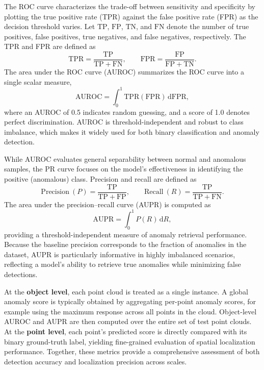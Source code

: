 The ROC curve characterizes the trade-off between sensitivity and specificity by plotting the true positive rate (TPR) against the false positive rate (FPR) as the decision threshold varies. Let $\mathrm{TP}$, $\mathrm{FP}$, $\mathrm{TN}$, and $\mathrm{FN}$ denote the number of true positives, false positives, true negatives, and false negatives, respectively. The TPR and FPR are defined as
\begin{equation}
\mathrm{TPR} = \frac{\mathrm{TP}}{\mathrm{TP} + \mathrm{FN}}, 
\qquad
\mathrm{FPR} = \frac{\mathrm{FP}}{\mathrm{FP} + \mathrm{TN}}.
\end{equation}
The area under the ROC curve (AUROC) summarizes the ROC curve into a single scalar measure,
\begin{equation}
\mathrm{AUROC} = \int_{0}^{1} \mathrm{TPR}(\mathrm{FPR})\,\mathrm{d}\mathrm{FPR},
\end{equation}
where an AUROC of 0.5 indicates random guessing, and a score of 1.0 denotes perfect discrimination. AUROC is threshold-independent and robust to class imbalance, which makes it widely used for both binary classification and anomaly detection.

While AUROC evaluates general separability between normal and anomalous samples, the PR curve focuses on the model’s effectiveness in identifying the positive (anomalous) class. Precision and recall are defined as
\begin{equation}
\mathrm{Precision}\ (P) = \frac{\mathrm{TP}}{\mathrm{TP} + \mathrm{FP}}, 
\qquad
\mathrm{Recall}\ (R) = \frac{\mathrm{TP}}{\mathrm{TP} + \mathrm{FN}}.
\end{equation}
The area under the precision–recall curve (AUPR) is computed as
\begin{equation}
\mathrm{AUPR} = \int_{0}^{1} P(R)\,\mathrm{d}R,
\end{equation}
providing a threshold-independent measure of anomaly retrieval performance. Because the baseline precision corresponds to the fraction of anomalies in the dataset, AUPR is particularly informative in highly imbalanced scenarios, reflecting a model’s ability to retrieve true anomalies while minimizing false detections.

At the \textbf{object level}, each point cloud is treated as a single instance. A global anomaly score is typically obtained by aggregating per-point anomaly scores, for example using the maximum response across all points in the cloud. Object-level AUROC and AUPR are then computed over the entire set of test point clouds. At the \textbf{point level}, each point’s predicted score is directly compared with its binary ground-truth label, yielding fine-grained evaluation of spatial localization performance. Together, these metrics provide a comprehensive assessment of both detection accuracy and localization precision across scales.

